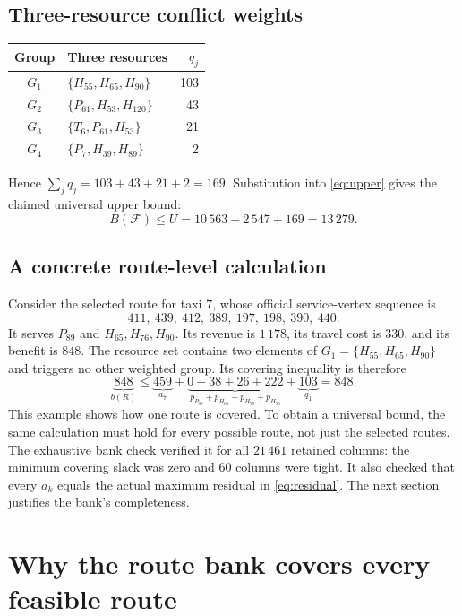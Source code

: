 \documentclass[11pt,a4paper]{article}
\newcommand{\F}{\mathcal F}
\begin{document}
\subsection{Three-resource conflict weights}
\begin{center}
\begin{tabular}{cl r}
\toprule
Group & Three resources & $q_j$\\
\midrule
$G_1$ & $\{H_{55}, H_{65}, H_{90}\}$ & 103 \\
$G_2$ & $\{P_{61}, H_{53}, H_{120}\}$ & 43 \\
$G_3$ & $\{T_{6}, P_{61}, H_{53}\}$ & 21 \\
$G_4$ & $\{P_{7}, H_{39}, H_{89}\}$ & 2 \\
\bottomrule
\end{tabular}
\end{center}
Hence $\sum_j q_j=103+43+21+2=169$. Substitution into
\eqref{eq:upper} gives the claimed universal upper bound:
\begin{equation}\label{eq:numerical}
 \boxed{B(\F)\leq U=10\,563+2\,547+169=13\,279.}
\end{equation}

\subsection{A concrete route-level calculation}

Consider the selected route for taxi $7$, whose official service-vertex
sequence is
\[
 411,\ 439,\ 412,\ 389,\ 197,\ 198,\ 390,\ 440.
\]
It serves $P_{89}$ and $H_{65},H_{76},H_{90}$. Its revenue is $1\,178$, its
travel cost is $330$, and its benefit is $848$. The resource set contains two
elements of $G_1=\{H_{55},H_{65},H_{90}\}$ and triggers no other weighted
group. Its covering inequality is therefore
\[
 \underbrace{848}_{b(R)}
 \leq \underbrace{459}_{a_7}
    +\underbrace{0+38+26+222}_{p_{P_{89}}+p_{H_{65}}+p_{H_{76}}+p_{H_{90}}}
    +\underbrace{103}_{q_1}
 =848.
\]
This example shows how one route is covered. To obtain a universal bound,
the same calculation must hold for every possible route, not just the
selected routes. The exhaustive bank check verified it for all $21\,461$
retained columns: the minimum covering slack was zero and $60$ columns were
tight. It also checked that every $a_k$ equals the actual maximum residual
in \eqref{eq:residual}. The next section justifies the bank's completeness.

\section{Why the route bank covers every feasible route}\label{sec:enumeration}
\end{document}

